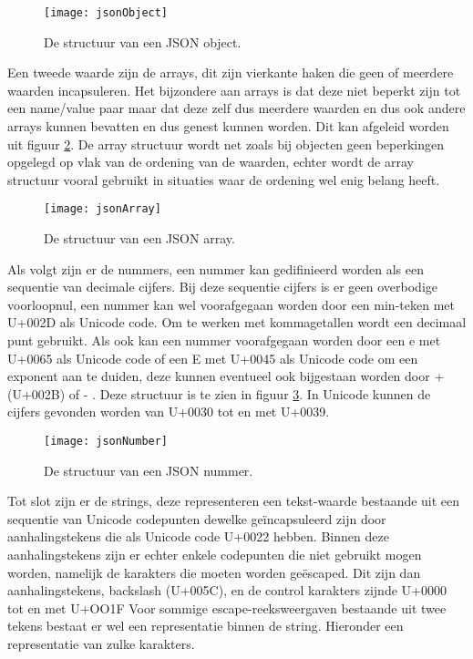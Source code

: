 \begin{figure}[h]
    \centering
\texttt{[image: jsonObject]}
\caption[JSON Object]{De structuur van een JSON object.}
    \label{fig:jsonObject}
\end{figure}

Een tweede waarde zijn de arrays, dit zijn vierkante haken die geen of meerdere waarden incapsuleren. Het bijzondere aan arrays is dat deze niet beperkt zijn tot een name/value paar maar dat deze zelf dus meerdere waarden en dus ook andere arrays kunnen bevatten en dus genest kunnen worden. Dit kan afgeleid worden uit figuur \ref{fig:jsonArray}. De array structuur wordt net zoals bij objecten geen beperkingen opgelegd op vlak van de ordening van de waarden, echter wordt de array structuur vooral gebruikt in situaties waar de ordening wel enig belang heeft.

\begin{figure}[h]
    \centering
    \texttt{[image: jsonArray]}
    \caption[JSON Array]{De structuur van een JSON array.}
    \label{fig:jsonArray}
\end{figure}

Als volgt zijn er de nummers, een nummer kan gedifinieerd worden als een sequentie van decimale cijfers. Bij deze sequentie cijfers is er geen overbodige voorloopnul, een nummer kan wel voorafgegaan worden door een min-teken met U+002D als Unicode code. Om te werken met kommagetallen wordt een decimaal punt gebruikt. Als ook kan een nummer voorafgegaan worden door een e met U+0065 als Unicode code of een E met U+0045 als Unicode code om een exponent aan te duiden, deze kunnen eventueel ook bijgestaan worden door + (U+002B) of - . Deze structuur is te zien in figuur \ref{fig:jsonNumber}.
In Unicode kunnen de cijfers gevonden worden van U+0030 tot en met U+0039. 

\begin{figure}[h]
    \centering
    \texttt{[image: jsonNumber]}
    \caption[JSON Nummer]{De structuur van een JSON nummer.}
    \label{fig:jsonNumber}
\end{figure}

Tot slot zijn er de strings, deze representeren een tekst-waarde bestaande uit een sequentie van Unicode codepunten dewelke geïncapsuleerd zijn door aanhalingstekens die als Unicode code U+0022 hebben. Binnen deze aanhalingstekens zijn er echter enkele codepunten die niet gebruikt mogen worden, namelijk de karakters die moeten worden geëscaped. Dit zijn dan aanhalingstekens, backslash (U+005C), en de control karakters zijnde U+0000 tot en met U+OO1F
Voor sommige escape-reeksweergaven bestaande uit twee tekens bestaat er wel een representatie binnen de string.
Hieronder een representatie van zulke karakters.

